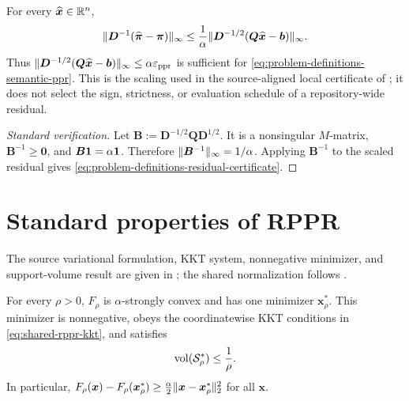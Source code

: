 \documentclass[11pt]{article}
\begin{document}
\begin{proposition}
\label{prop:problem-definitions-residual-certificate}
For every $\widehat{\bm{x}}\in\mathbb{R}^n$,
\begin{equation}
    \lVert\bm{D}^{-1}
      (\widehat{\bm{\pi}}-\bm{\pi})\rVert_\infty
    \leq
    \frac{1}{\alpha}
    \lVert\bm{D}^{-1/2}
      (\bm{Q}\widehat{\bm{x}}-\bm{b})\rVert_\infty.
    \label{eq:problem-definitions-residual-certificate}
\end{equation}
Thus
$\lVert\bm{D}^{-1/2}
  (\bm{Q}\widehat{\bm{x}}-\bm{b})\rVert_\infty\leq\alpha\varepsilon_{\mathrm{ppr}}$
is sufficient for \cref{eq:problem-definitions-semantic-ppr}.  This is the
scaling used in the source-aligned local certificate of
\citet{zhou2024iterative}; it does not select the sign, strictness, or
evaluation schedule of a repository-wide residual.
\end{proposition}

\begin{proof}[Standard verification]
Let $\bm{B}:=\bm{D}^{-1/2}\bm{Q}\bm{D}^{1/2}$. It is a nonsingular
$M$-matrix, $\bm{B}^{-1}\geq\bm{0}$, and
$\bm{B}\mathbf{1}=\alpha\mathbf{1}$. Therefore
$\lVert\bm{B}^{-1}\rVert_\infty=1/\alpha$. Applying $\bm{B}^{-1}$ to the scaled
residual gives \cref{eq:problem-definitions-residual-certificate}.
\end{proof}

\section{Standard properties of RPPR}
\label{sec:problem-definitions-rppr-properties}

The source variational formulation, KKT system, nonnegative minimizer, and
support-volume result are given in \citet[Section~4 and
Theorems~1--2]{fountoulakis2019variational}; the shared normalization follows
\citet[Section~3]{fountoulakis2026complexity}.

\begin{proposition}
\label{prop:problem-definitions-rppr-source}
For every $\rho>0$, $F_\rho$ is $\alpha$-strongly convex and has one minimizer
$\bm{x}_\rho^*$. This minimizer is nonnegative, obeys the coordinatewise
KKT conditions in \cref{eq:shared-rppr-kkt}, and satisfies
\begin{equation}
    \operatorname{vol}(\mathcal{S}_\rho^*)\leq\frac{1}{\rho}.
    \label{eq:problem-definitions-support-volume}
\end{equation}
In particular,
$F_\rho(\bm{x})-F_\rho(\bm{x}_\rho^*)\geq
\frac{\alpha}{2}\lVert\bm{x}-\bm{x}_\rho^*\rVert_2^2$ for all $\bm{x}$.
\end{proposition}
\end{document}
